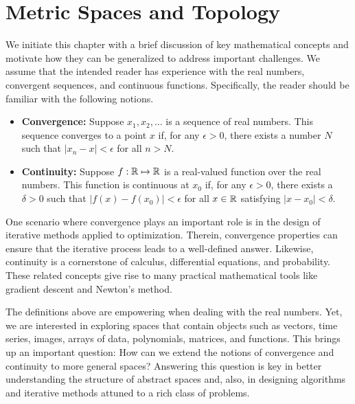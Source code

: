 \chapter{Metric Spaces and Topology}
\label{chap:metric_spaces}

We initiate this chapter with a brief discussion of key mathematical concepts and motivate how they can be generalized to address important challenges.
We assume that the intended reader has experience with the real numbers, convergent sequences, and continuous functions.
Specifically, the reader should be familiar with the following notions.
\begin{itemize}
\item \textbf{Convergence:}
Suppose $x_1, x_2, \ldots$ is a sequence of real numbers.
This sequence converges to a point $x$ if, for any $\epsilon > 0$, there exists a number $N$ such that $| x_n - x | < \epsilon$ for all $n > N$.
\item \textbf{Continuity:}
Suppose $f : \mathbb{R} \mapsto \mathbb{R}$ is a real-valued function over the real numbers.
This function is continuous at $x_0$ if, for any $\epsilon > 0$, there exists a $\delta > 0$ such that $| f(x) - f(x_0) | < \epsilon$ for all $x \in \mathbb{R}$ satisfying $|x - x_0| < \delta$.
\end{itemize}
One scenario where convergence plays an important role is in the design of iterative methods applied to optimization.
Therein, convergence properties can ensure that the iterative process leads to a well-defined answer.
Likewise, continuity is a cornerstone of calculus, differential equations, and probability.
These related concepts give rise to many practical mathematical tools like gradient descent and Newton's method.

The definitions above are empowering when dealing with the real numbers.
Yet, we are interested in exploring spaces that contain objects such as vectors, time series, images, arrays of data, polynomials, matrices, and functions.
This brings up an important question: How can we extend the notions of convergence and continuity to more general spaces?
Answering this question is key in better understanding the structure of abstract spaces and, also, in designing algorithms and iterative methods attuned to a rich class of problems.

